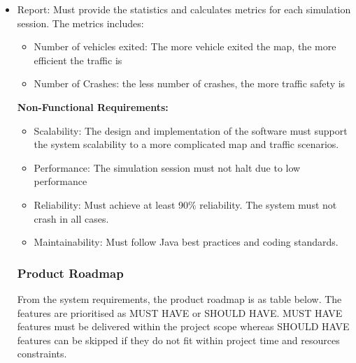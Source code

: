 \documentclass[11pt]{article}
\begin{document}
{\begin{itemize}
\begin{itemize}
\begin{itemize}
\begin{itemize}
\begin{itemize}
                \item LOW: 10\% possibility there is a new vehicle generated in each simulation step
                \end{itemize}
            \item Selected Map
            
            
            \end{itemize}
        
        \item Check the traffic context to make decision whether vehicles go straight, turn right, turn left, 3-point turn, increase speed, reduce speed or stop
        \end{itemize}
        
        
       
        \item Report: Must provide the statistics and calculates     metrics  for each simulation session. The metrics includes:
        \begin{itemize}
        \item Number of vehicles exited: The more vehicle exited the map, the more efficient the traffic is 
        \item Number of Crashes: the less number of crashes, the more traffic safety is
        
        \end{itemize}
        

    
    {\bf{Non-Functional Requirements:}} 
    \begin{itemize}
    \item Scalability: The design and implementation of the software must support the system scalability to a more complicated map and traffic scenarios. 
    \item Performance: The simulation session must not halt due to low performance
    \item Reliability: Must achieve at least 90\% reliability. The system must not crash in all cases.
    \item Maintainability: Must follow Java best practices and coding standards. 
    
    \end{itemize}
   
      \subsubsection{Product Roadmap}
  From the system requirements, the product roadmap is as table below. The features are prioritised as MUST HAVE or SHOULD HAVE. MUST HAVE features must be delivered within the project scope whereas SHOULD HAVE features can be skipped if they do not fit within project time and resources  constraints.
  

\end{itemize}
\end{itemize}}
\end{document}

